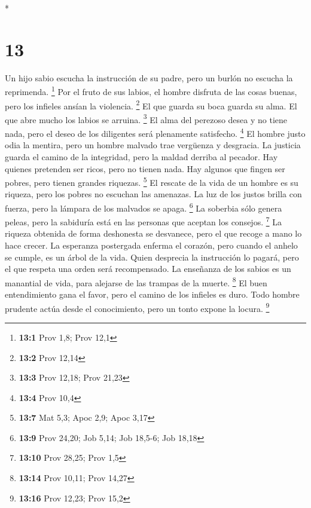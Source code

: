 \begin{paracol}{2}
\begin{otherlanguage}{english}
\end{otherlanguage}

\switchcolumn[0]*

\hypertarget{section-24}{%
\section{13}\label{section-24}}

 Un hijo sabio escucha la instrucción de su padre, pero un
burlón no escucha la reprimenda. \footnote{\textbf{13:1} Prov 1,8; Prov
  12,1}  Por el fruto de sus labios, el hombre disfruta de
las cosas buenas, pero los infieles ansían la violencia. \footnote{\textbf{13:2}
  Prov 12,14}  El que guarda su boca guarda su alma. El
que abre mucho los labios se arruina. \footnote{\textbf{13:3} Prov
  12,18; Prov 21,23}  El alma del perezoso desea y no
tiene nada, pero el deseo de los diligentes será plenamente satisfecho.
\footnote{\textbf{13:4} Prov 10,4}  El hombre justo odia
la mentira, pero un hombre malvado trae vergüenza y desgracia.
 La justicia guarda el camino de la integridad, pero la
maldad derriba al pecador.  Hay quienes pretenden ser
ricos, pero no tienen nada. Hay algunos que fingen ser pobres, pero
tienen grandes riquezas. \footnote{\textbf{13:7} Mat 5,3; Apoc 2,9; Apoc
  3,17}  El rescate de la vida de un hombre es su riqueza,
pero los pobres no escuchan las amenazas.  La luz de los
justos brilla con fuerza, pero la lámpara de los malvados se apaga.
\footnote{\textbf{13:9} Prov 24,20; Job 5,14; Job 18,5-6; Job 18,18}
 La soberbia sólo genera peleas, pero la sabiduría está
en las personas que aceptan los consejos. \footnote{\textbf{13:10} Prov
  28,25; Prov 1,5}  La riqueza obtenida de forma
deshonesta se desvanece, pero el que recoge a mano lo hace crecer.
 La esperanza postergada enferma el corazón, pero cuando
el anhelo se cumple, es un árbol de la vida.  Quien
desprecia la instrucción lo pagará, pero el que respeta una orden será
recompensado.  La enseñanza de los sabios es un manantial
de vida, para alejarse de las trampas de la muerte. \footnote{\textbf{13:14}
  Prov 10,11; Prov 14,27}  El buen entendimiento gana el
favor, pero el camino de los infieles es duro.  Todo
hombre prudente actúa desde el conocimiento, pero un tonto expone la
locura. \footnote{\textbf{13:16} Prov 12,23; Prov 15,2} 

\end{paracol}
